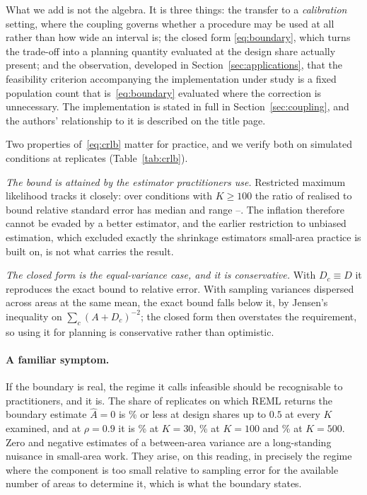 What we add is not the algebra. It is three things: the transfer to a
\emph{calibration} setting, where the coupling governs whether a procedure may
be used at all rather than how wide an interval is; the closed form
\eqref{eq:boundary}, which turns the trade-off into a planning quantity
evaluated at the design share actually present; and the observation, developed
in Section~\ref{sec:applications}, that the feasibility criterion accompanying
the implementation under study is a fixed population count that
is~\eqref{eq:boundary} evaluated where the correction is unnecessary. The
implementation is stated in full in Section~\ref{sec:coupling}, and the
authors' relationship to it is described on the title page.

Two properties of~\eqref{eq:crlb} matter for practice, and we verify both on
\InfCells{} simulated conditions at \InfReps{} replicates
(Table~\ref{tab:crlb}).

\emph{The bound is attained by the estimator practitioners use.} Restricted
maximum likelihood tracks it closely: over conditions with $K\ge100$ the ratio
of realised to bound relative standard error has median \InfRatioMed{} and
range \InfRatioLo--\InfRatioHi. The inflation therefore cannot be evaded by a
better estimator, and the earlier restriction to unbiased estimation, which
excluded exactly the shrinkage estimators small-area practice is built on, is
not what carries the result.

\emph{The closed form is the equal-variance case, and it is conservative.}
With $D_c\equiv D$ it reproduces the exact bound to \InfClosedErr{} relative
error. With sampling variances dispersed across areas at the same mean, the
exact bound falls below it, by Jensen's inequality on $\sum_c(A+D_c)^{-2}$; the
closed form then overstates the requirement, so using it for planning is
conservative rather than optimistic.

\paragraph{A familiar symptom.} If the boundary is real, the regime it calls
infeasible should be recognisable to practitioners, and it is. The share of
replicates on which REML returns the boundary estimate $\widehat A=0$ is
\ZeroLoRho\% or less at design shares up to $0.5$ at every $K$ examined, and at
$\rho=0.9$ it is \ZeroHiRhoLoK\% at $K=30$, \ZeroHiRhoMidK\% at $K=100$ and
\ZeroHiRhoHiK\% at $K=500$. Zero and negative estimates of a between-area
variance are a long-standing nuisance in small-area work. They arise, on this
reading, in precisely the regime where the component is too small relative to
sampling error for the available number of areas to determine it, which is what
the boundary states.

